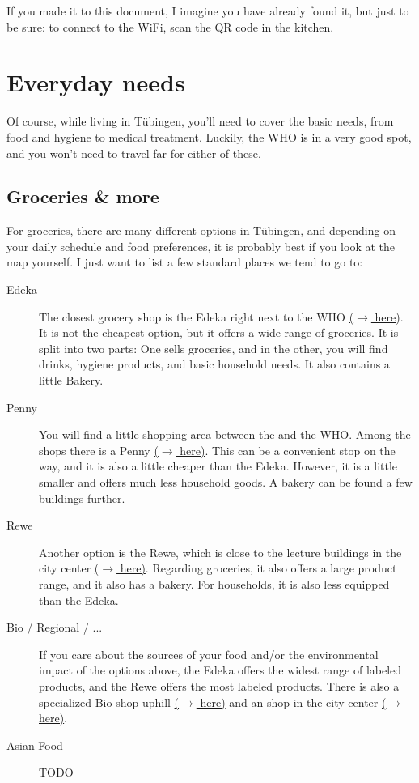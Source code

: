 If you made it to this document, I imagine you have already found it, but just to be sure: to connect to the WiFi, scan the QR code in the kitchen.

\section{Everyday needs}
Of course, while living in Tübingen, you'll need to cover the basic needs, from food and hygiene to medical treatment. Luckily, the WHO is in a very good spot, and you won't need to travel far for either of these.  

\subsection{Groceries \& more}
For groceries, there are many different options in Tübingen, and depending on your daily schedule and food preferences, it is probably best if you look at the map yourself. I just want to list a few standard places we tend to go to:

\begin{description}
    \item[Edeka]
    The closest grocery shop is the Edeka right next to the WHO \href{https://maps.app.goo.gl/DTd9KutteiG8m5L1A}{($\xrightarrow{}$ here)}. It is not the cheapest option, but it offers a wide range of groceries. It is split into two parts: One sells groceries, and in the other, you will find drinks, hygiene products, and basic household needs. It also contains a little Bakery.
    
    \item[Penny]
    You will find a little shopping area between the  and the WHO. Among the shops there is a Penny \href{https://maps.app.goo.gl/7F1s1fUtsefv49gv8}{($\xrightarrow{}$ here)}. This can be a convenient stop on the way, and it is also a little cheaper than the Edeka. However, it is a little smaller and offers much less household goods. A bakery can be found a few buildings further.

    \item[Rewe]
    Another  option is the Rewe, which is close to the lecture buildings in the city center \href{https://maps.app.goo.gl/Sj6d82QsJSTaGCuv5}{($\xrightarrow{}$ here)}. Regarding groceries, it also offers a large product range, and it also has a bakery. For households, it is also less equipped than the Edeka.

    \item[Bio / Regional / ...]
    If you care about the sources of your food and/or the environmental impact of the options above, the Edeka offers the widest range of  labeled products, and the Rewe offers the most  labeled products. There is also a specialized Bio-shop uphill \href{https://maps.app.goo.gl/EEEsyTK1hGbJ5H1B6}{($\xrightarrow{}$ here)} and an  shop in the city center \href{https://maps.app.goo.gl/8ppTPAT6ZfP2TXeg6}{($\xrightarrow{}$ here)}.

    \item[Asian Food]
    {\color{darkred} TODO}
\end{description}


